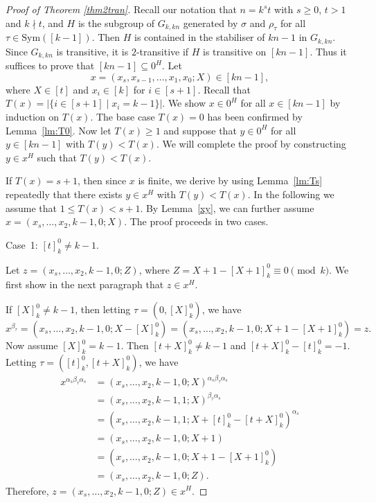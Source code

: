 \documentclass[11pt,a4paper,reqno]{amsart}
\newcommand{\Sym}{\mathrm{Sym}}
\theoremstyle{definition}
\begin{document}
\begin{proof}[Proof of Theorem \ref{thm2tran}]
Recall our notation that $n=k^st$ with $s\geq0$, $t>1$ and $k\nmid t$, and $H$ is the subgroup of $G_{k,kn}$ generated by $\sigma$ and $\rho_{\tau}$ for all $\tau\in \Sym([k-1])$. Then $H$ is contained in the stabiliser of $kn-1$ in $G_{k,kn}$. Since $G_{k,kn}$ is transitive, it is $2$-transitive if $H$ is transitive on $[kn-1]$. Thus it suffices to prove that $[kn-1]\subseteq 0^H$.  Let
\begin{equation*}
x=(x_{s},x_{s-1},\ldots,x_1,x_0;X)\in [kn-1],
\end{equation*}
where $X\in[t]$ and $x_i\in[k]$ for $i\in[s+1]$.
Recall that $T(x)=|\{i\in[s+1]\mid x_i=k-1\}|$. We show $x\in 0^{H}$ for all $x\in[kn-1]$ by induction on $T(x)$. The base case $T(x)=0$ has been confirmed by Lemma~\ref{lm:T0}. Now let $T(x)\geq 1$ and suppose that $y\in 0^{H}$ for all $y\in[kn-1]$ with $T(y)<T(x)$.
We will complete the proof by constructing $y\in x^H$ such that $T(y)<T(x)$.

If $T(x)=s+1$, then since $x$ is finite, we derive by using Lemma~\ref{lm:Ts} repeatedly that there exists $y\in x^H$ with $T(y)<T(x)$.
In the following we assume that $1\le T(x)<s+1$.  By Lemma~\ref{xy}, we can further assume $x=(x_s,\ldots,x_2,k-1,0;X)$.
The proof proceeds in two cases.

\textsf{Case~1}: $[t]_k^0\neq k-1$.

Let $z=(x_s,\ldots,x_2,k-1,0;Z)$, where $Z=X+1-[X+1]_k^0\equiv 0\pmod{k}$.
We first show in the next paragraph that $z\in x^H$.

If $[X]_k^0\neq k-1$, then letting $\tau=(0, [X]_k^0)$, we have
\[
  x^{\beta_{\tau}}=(x_s,\ldots,x_2,k-1,0;X-[X]_k^0)=(x_s,\ldots,x_2,k-1,0;X+1-[X+1]_k^0)=z.
\]
Now assume $[X]_k^0= k-1$. Then $[t+X]_k^0\neq k-1$ and $[t+X]_k^0-[t]_k^0=-1$. Letting $\tau=([t]_k^0, [t+X]_k^0)$, we have
  \begin{align*}
    x^{\alpha_s\beta_{\tau}\alpha_s}&=(x_s,\ldots,x_2,k-1,0;X)^{\alpha_s\beta_{\tau}\alpha_s}\\
    &=(x_s,\ldots,x_2,k-1,1;X)^{\beta_{\tau}\alpha_s}\\
    &=(x_s,\ldots,x_2,k-1,1;X+[t]_k^0-[t+X]_k^0)^{\alpha_s}\\
    &=(x_s,\ldots,x_2,k-1,0;X+1)\\
    &=(x_s,\ldots,x_2,k-1,0;X+1-[X+1]_k^0)\\
    &=(x_s,\ldots,x_2,k-1,0;Z).
  \end{align*}
Therefore, $z=(x_s,\ldots,x_2,k-1,0;Z)\in x^H$.


\end{proof}
\end{document}
